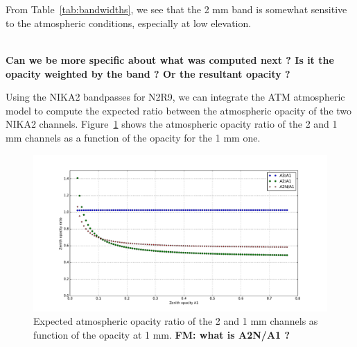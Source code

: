 \\
\\

From Table~\ref{tab:bandwidths}, we see that the 2 mm band is somewhat
sensitive to the atmospheric conditions, especially at low elevation.



\\


{\bf Can we be more specific about what was computed next ? Is it the
  opacity weighted by the band ? Or the resultant opacity ?}

Using the NIKA2 bandpasses for N2R9, we can integrate the ATM
atmospheric model to compute the expected ratio between the
atmospheric opacity of the two NIKA2 channels. 
Figure~\ref{thopacities} shows the atmospheric opacity
ratio of the 2 and 1 mm channels as a function of the opacity for the
1 mm one.

\begin{figure}[ht] %
\begin{center}
\includegraphics[width=\textwidth]{Figures/SpectralBands/opacity_ratio_vs_tau1.pdf}
\caption{Expected atmospheric opacity ratio of the 2 and 1 mm channels as function 
of the opacity at 1 mm. {\bf FM: what is A2N/A1 ?}}
\label{thopacities}
\end{center}
\end{figure}





\\
\\
\\
